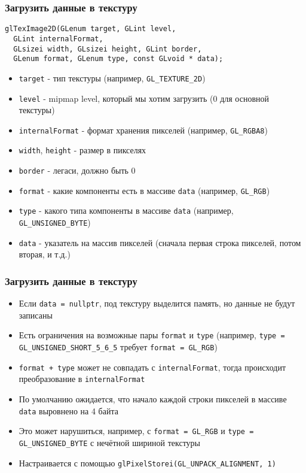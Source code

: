 \documentclass{beamer}
\begin{document}
\begin{frame}[fragile]
\frametitle{Загрузить данные в текстуру}
\begin{verbatim}
glTexImage2D(GLenum target, GLint level,
  GLint internalFormat,
  GLsizei width, GLsizei height, GLint border,
  GLenum format, GLenum type, const GLvoid * data);
\end{verbatim}
\begin{itemize}
\item \verb|target| - тип текстуры (например, \verb|GL_TEXTURE_2D|)
\item \verb|level| - mipmap level, который мы хотим загрузить (0 для основной текстуры)
\item \verb|internalFormat| - формат хранения пикселей (например, \verb|GL_RGBA8|)
\item \verb|width|, \verb|height| - размер в пикселях
\item \verb|border| - легаси, должно быть 0
\item \verb|format| - какие компоненты есть в массиве \verb|data| (например, \verb|GL_RGB|)
\item \verb|type| - какого типа компоненты в массиве \verb|data| (например, \verb|GL_UNSIGNED_BYTE|)
\item \verb|data| - указатель на массив пикселей (сначала первая строка пикселей, потом вторая, и т.д.)
\end{itemize}
\end{frame}

\begin{frame}[fragile]
\frametitle{Загрузить данные в текстуру}
\begin{itemize}
\item Если \verb|data = nullptr|, под текстуру выделится память, но данные не будут записаны
\pause
\item Есть ограничения на возможные пары \verb|format| и \verb|type| (например, \verb|type = GL_UNSIGNED_SHORT_5_6_5| требует \verb|format = GL_RGB|)
\pause
\item \verb|format + type| может не совпадать с \verb|internalFormat|, тогда происходит преобразование в \verb|internalFormat|
\pause
\item По умолчанию ожидается, что начало каждой строки пикселей в массиве \verb|data| выровнено на 4 байта
\item Это может нарушиться, например, с \verb|format = GL_RGB| и \verb|type = GL_UNSIGNED_BYTE| с нечётной шириной текстуры
\item Настраивается с помощью \verb|glPixelStorei(GL_UNPACK_ALIGNMENT, 1)|
\end{itemize}
\end{frame}
\end{document}
